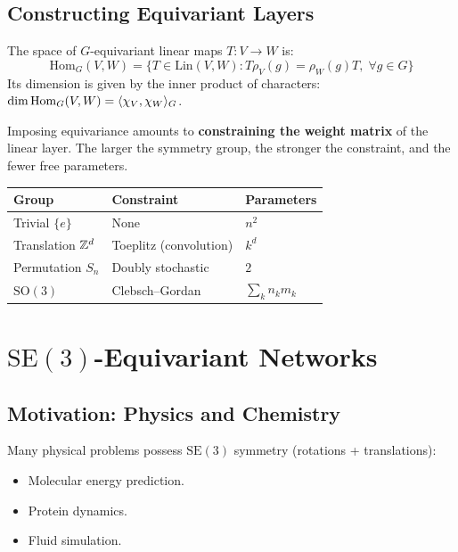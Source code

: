 \subsection{Constructing Equivariant Layers}

\begin{theorem}
The space of $G$-equivariant linear maps $T: V \to W$ is:
\[
    \mathrm{Hom}_G(V, W) = \{T \in \mathrm{Lin}(V, W) :
    T \rho_V(g) = \rho_W(g) T,\; \forall g \in G\}
\]
Its dimension is given by the inner product of characters:
$\dim \mathrm{Hom}_G(V, W) = \langle \chi_V, \chi_W \rangle_G$.
\end{theorem}

\begin{intuition}[title=\textbf{Equivariance constraint = weight sharing}]
Imposing equivariance amounts to \textbf{constraining the weight matrix} of
the linear layer. The larger the symmetry group, the stronger the constraint,
and the fewer free parameters.
\begin{center}
\begin{tabular}{lll}
\toprule
\textbf{Group} & \textbf{Constraint} & \textbf{Parameters} \\
\midrule
Trivial $\{e\}$ & None & $n^2$ \\
Translation $\mathbb{Z}^d$ & Toeplitz (convolution) & $k^d$ \\
Permutation $S_n$ & Doubly stochastic & $2$ \\
$\mathrm{SO}(3)$ & Clebsch--Gordan & $\sum_k n_k m_k$ \\
\bottomrule
\end{tabular}
\end{center}
\end{intuition}

\section{$\mathrm{SE}(3)$-Equivariant Networks}

\subsection{Motivation: Physics and Chemistry}

Many physical problems possess $\mathrm{SE}(3)$ symmetry (rotations +
translations):
\begin{itemize}
    \item Molecular energy prediction.
    \item Protein dynamics.
    \item Fluid simulation.
\end{itemize}

